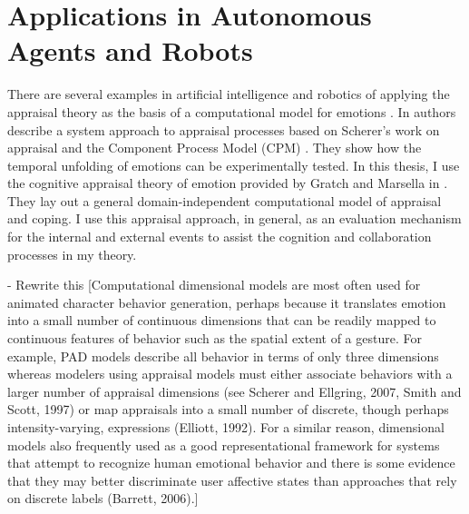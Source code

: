 \documentclass[11pt]{article}
\begin{document}
\section{Applications in Autonomous Agents and Robots}

There are several examples in artificial intelligence and robotics of applying
the appraisal theory as the basis of a computational model for emotions
\cite{adam:bdi-emotional-companion,kim:model-hri-appraisal,
marsella:ema-process-model}. In \cite{sander:systems-approach-appraisal} authors
describe a system approach to appraisal processes based on Scherer's work on
appraisal and the Component Process Model (CPM)
\cite{scherer:nature-function-emotion}. They show how the temporal unfolding
of emotions can be experimentally tested. In this thesis, I use the cognitive
appraisal theory of emotion provided by Gratch and Marsella in
\cite{gratch:domain-independent}. They lay out a general domain-independent
computational model of appraisal and coping. I use this appraisal approach,
in general, as an evaluation mechanism for the internal and external events to
assist the cognition and collaboration processes in my theory.

- Rewrite this [Computational dimensional models are most often used for
animated character behavior generation, perhaps because it translates emotion
into a small number of continuous dimensions that can be readily mapped to
continuous features of behavior such as the spatial extent of a gesture. For
example, PAD models describe all behavior in terms of only three dimensions
whereas modelers using appraisal models must either associate behaviors with a
larger number of appraisal dimensions (see Scherer and Ellgring, 2007, Smith and
Scott, 1997) or map appraisals into a small number of discrete, though perhaps
intensity-varying, expressions (Elliott, 1992). For a similar reason,
dimensional models also frequently used as a good representational framework for
systems that attempt to recognize human emotional behavior and there is some
evidence that they may better discriminate user affective states than approaches
that rely on discrete labels (Barrett, 2006).]
\end{document}
